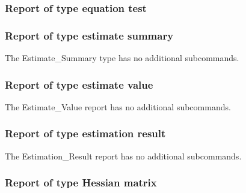 \subsubsection{Report of type equation test}
\label{syntax:Report-EquationTest}


\subsubsection{Report of type estimate summary}
\label{syntax:Report-EstimateSummary}


The Estimate\_Summary type has no additional subcommands.

\subsubsection{Report of type estimate value}
\label{syntax:Report-EstimateValue}


The Estimate\_Value report has no additional subcommands.

\subsubsection{Report of type estimation result}
\label{syntax:Report-EstimationResult}


The Estimation\_Result report has no additional subcommands.

\subsubsection{Report of type Hessian matrix}
\label{syntax:Report-HessianMatrix}

